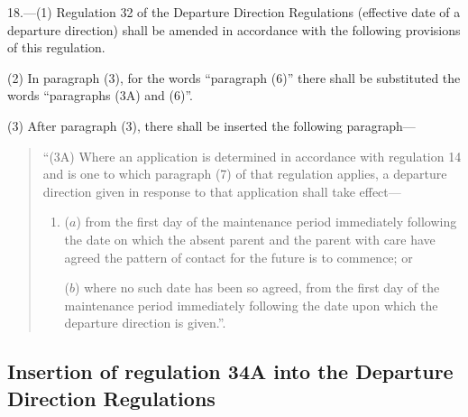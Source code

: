 \documentclass[12pt,a4paper]{article}
\begin{document}
18.—(1) Regulation 32 of the Departure Direction Regulations (effective date of a departure direction) shall be amended in accordance with the following provisions of this regulation.

(2) In paragraph (3), for the words “paragraph (6)” there shall be substituted the words “paragraphs (3A) and (6)”.

(3) After paragraph (3), there shall be inserted the following paragraph—
\begin{quotation}
“(3A) Where an application is determined in accordance with regulation 14 and is one to which paragraph (7) of that regulation applies, a departure direction given in response to that application shall take effect—
\begin{enumerate}\item[]
($a$) from the first day of the maintenance period immediately following the date on which the absent parent and the parent with care have agreed the pattern of contact for the future is to commence; or

($b$) where no such date has been so agreed, from the first day of the maintenance period immediately following the date upon which the departure direction is given.”.
\end{enumerate}
\end{quotation}

\subsection[19. Insertion of regulation 34A into the Departure Direction Regulations]{Insertion of regulation 34A into the Departure Direction Regulations}
\end{document}
